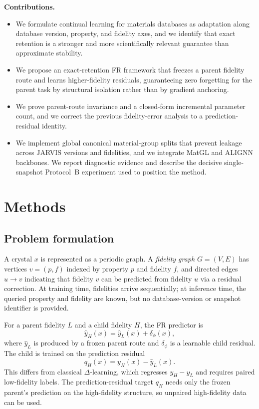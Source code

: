 \documentclass{article}
\theoremstyle{plain}
\theoremstyle{definition}
\theoremstyle{remark}
\begin{document}
\textbf{Contributions.}
\begin{itemize}[leftmargin=*]
    \item We formulate continual learning for materials databases as adaptation along database version, property, and fidelity axes, and we identify that exact retention is a stronger and more scientifically relevant guarantee than approximate stability.
    \item We propose an exact-retention FR framework that freezes a parent fidelity route and learns higher-fidelity residuals, guaranteeing zero forgetting for the parent task by structural isolation rather than by gradient anchoring.
    \item We prove parent-route invariance and a closed-form incremental parameter count, and we correct the previous fidelity-error analysis to a prediction-residual identity.
    \item We implement global canonical material-group splits that prevent leakage across JARVIS versions and fidelities, and we integrate MatGL and ALIGNN backbones. We report diagnostic evidence and describe the decisive single-snapshot Protocol~B experiment used to position the method.
\end{itemize}

\section{Methods}

\subsection{Problem formulation}

A crystal $x$ is represented as a periodic graph. A \emph{fidelity graph} $G=(V,E)$ has vertices $v=(p,f)$ indexed by property $p$ and fidelity $f$, and directed edges $u\to v$ indicating that fidelity $v$ can be predicted from fidelity $u$ via a residual correction. At training time, fidelities arrive sequentially; at inference time, the queried property and fidelity are known, but no database-version or snapshot identifier is provided.

For a parent fidelity $L$ and a child fidelity $H$, the FR predictor is
\begin{equation}
\hat y_H(x) = \hat y_L(x) + \delta_\phi(x),
\label{eq:fr-predictor}
\end{equation}
where $\hat y_L$ is produced by a frozen parent route and $\delta_\phi$ is a learnable child residual. The child is trained on the prediction residual
\begin{equation}
q_H(x) = y_H(x) - \hat y_L(x).
\label{eq:prediction-residual}
\end{equation}
This differs from classical $\Delta$-learning, which regresses $y_H-y_L$ and requires paired low-fidelity labels. The prediction-residual target $q_H$ needs only the frozen parent's prediction on the high-fidelity structure, so unpaired high-fidelity data can be used.
\end{document}
